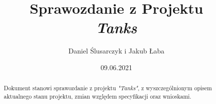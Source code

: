 \documentclass[11pt,a4paper]{report}
\title{\Huge Sprawozdanie z Projektu\\\textsl{Tanks}}
\author{Daniel Ślusarczyk i Jakub Łaba}
\date{09.06.2021}
\begin{document}
\maketitle

\renewcommand*\thesection{\arabic{section}} 
\begin{abstract}
Dokument stanowi sprawozdanie z projektu \textsl{"Tanks"}, z wyszczególnionym opisem aktualnego stanu projektu, zmian względem specyfikacji oraz wnioskami.
\end{abstract}

\pagestyle{fancy}
\fancyhf{}
\setcounter{page}{0}

{
\fancyhead{} 
\fancyfoot{} 
}
\thispagestyle{empty} 
\tableofcontents 
\thispagestyle{empty}
\newpage

{
\fancyhead{} 
\fancyfoot[C]{\thepage}
}


\end{document}
